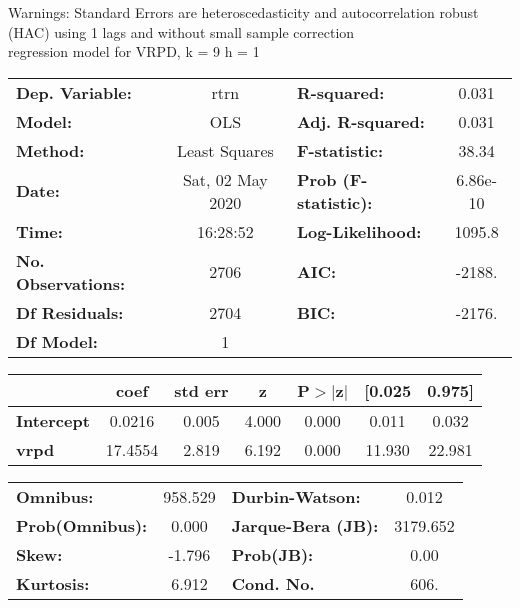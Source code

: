 Warnings: \newline
 [1] Standard Errors are heteroscedasticity and autocorrelation robust (HAC) using 1 lags and without small sample correction\\ 

regression model for VRPD, k = 9 h = 1\begin{center}
\begin{tabular}{lclc}
\toprule
\textbf{Dep. Variable:}    &       rtrn       & \textbf{  R-squared:         } &     0.031   \\
\textbf{Model:}            &       OLS        & \textbf{  Adj. R-squared:    } &     0.031   \\
\textbf{Method:}           &  Least Squares   & \textbf{  F-statistic:       } &     38.34   \\
\textbf{Date:}             & Sat, 02 May 2020 & \textbf{  Prob (F-statistic):} &  6.86e-10   \\
\textbf{Time:}             &     16:28:52     & \textbf{  Log-Likelihood:    } &    1095.8   \\
\textbf{No. Observations:} &        2706      & \textbf{  AIC:               } &    -2188.   \\
\textbf{Df Residuals:}     &        2704      & \textbf{  BIC:               } &    -2176.   \\
\textbf{Df Model:}         &           1      & \textbf{                     } &             \\
\bottomrule
\end{tabular}
\begin{tabular}{lcccccc}
                   & \textbf{coef} & \textbf{std err} & \textbf{z} & \textbf{P$> |$z$|$} & \textbf{[0.025} & \textbf{0.975]}  \\
\midrule
\textbf{Intercept} &       0.0216  &        0.005     &     4.000  &         0.000        &        0.011    &        0.032     \\
\textbf{vrpd}      &      17.4554  &        2.819     &     6.192  &         0.000        &       11.930    &       22.981     \\
\bottomrule
\end{tabular}
\begin{tabular}{lclc}
\textbf{Omnibus:}       & 958.529 & \textbf{  Durbin-Watson:     } &    0.012  \\
\textbf{Prob(Omnibus):} &   0.000 & \textbf{  Jarque-Bera (JB):  } & 3179.652  \\
\textbf{Skew:}          &  -1.796 & \textbf{  Prob(JB):          } &     0.00  \\
\textbf{Kurtosis:}      &   6.912 & \textbf{  Cond. No.          } &     606.  \\
\bottomrule
\end{tabular}
\end{center}

